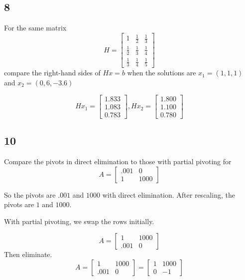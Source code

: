 \documentclass[12pt,letterpaper]{article}
\begin{document}
    \subsection*{8}
      For the same matrix
      \[
        H = \left[
        \begin{array}{ccc}
        1           & \frac{1}{2} & \frac{1}{3} \\
        \frac{1}{2} & \frac{1}{3} & \frac{1}{4} \\
        \frac{1}{3} & \frac{1}{4} & \frac{1}{5}
        \end{array}
        \right]
      \]
      compare the right-hand sides of $Hx = b$ when the solutions are
      $x_1 = (1,1,1)$ and $x_2 = (0,6,-3.6)$

      \[
        Hx_1 =
        \left[
        \begin{array}{c}
        1.833 \\
        1.083 \\
        0.783
        \end{array}
        \right]
        ,
        Hx_2 =
        \left[
        \begin{array}{c}
        1.800 \\
        1.100 \\
        0.780
        \end{array}
        \right]
      \]
    \subsection*{10}
      Compare the pivots in direct elimination to those with partial pivoting for
      \[
        A =
        \left[
        \begin{array}{cc}
        .001 & 0    \\
        1    & 1000
        \end{array}
        \right]
      \]

      So the pivots are $.001$ and $1000$ with direct elimination.
      After rescaling, the pivots are $1$ and $1000$.

      With partial pivoting, we swap the rows initially.

      \[
        A =
        \left[
        \begin{array}{cc}
        1    & 1000 \\
        .001 & 0
        \end{array}
        \right]
      \]
      Then eliminate.
      \[
        A =
        \left[
        \begin{array}{cc}
        1    & 1000 \\
        .001 & 0
        \end{array}
        \right]
        =
        \left[
        \begin{array}{cc}
        1 & 1000 \\
        0 & -1
        \end{array}
        \right]
      \]
\end{document}
